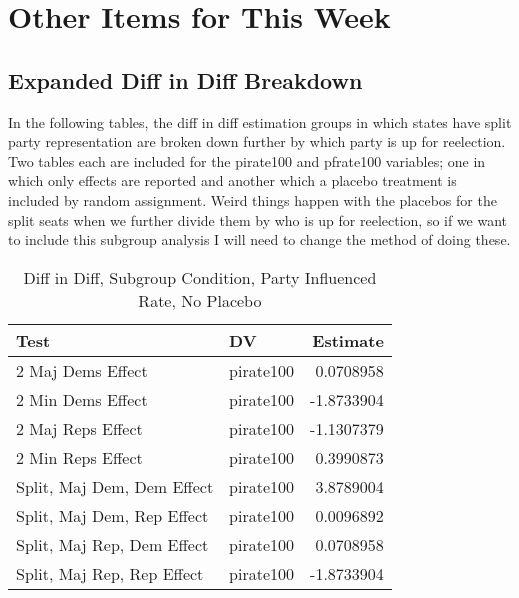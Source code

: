 \documentclass[12pt]{article}
\begin{document}
\section{Other Items for This Week}



\subsection{Expanded Diff in Diff Breakdown}

In the following tables, the diff in diff estimation groups in which states have split party representation are broken down further by which party is up for reelection. Two tables each are included for the pirate100 and pfrate100 variables; one in which only effects are reported and another which a placebo treatment is included by random assignment. Weird things happen with the placebos for the split seats when we further divide them by who is up for reelection, so if we want to include this subgroup analysis I will need to change the method of doing these.

\begin{table}[ht]
	\centering
	\caption{Diff in Diff, Subgroup Condition, Party Influenced Rate, No Placebo}
	\begin{tabular}{llr}
		\hline
		Test & DV & Estimate \\ 
		\hline
		2 Maj Dems Effect & pirate100 & 0.0708958 \\  
		2 Min Dems Effect & pirate100 & -1.8733904 \\  
		\hline
		2 Maj Reps Effect & pirate100 & -1.1307379 \\ 
		2 Min Reps Effect & pirate100 & 0.3990873 \\ 
		\hline
		Split, Maj Dem, Dem Effect & pirate100 & 3.8789004 \\ 
		Split, Maj Dem, Rep Effect & pirate100 & 0.0096892 \\  
		\hline
		Split, Maj Rep, Dem Effect & pirate100 & 0.0708958 \\ 
		Split, Maj Rep, Rep Effect & pirate100 & -1.8733904 \\ 
		\hline
	\end{tabular}
\end{table}
\end{document}
